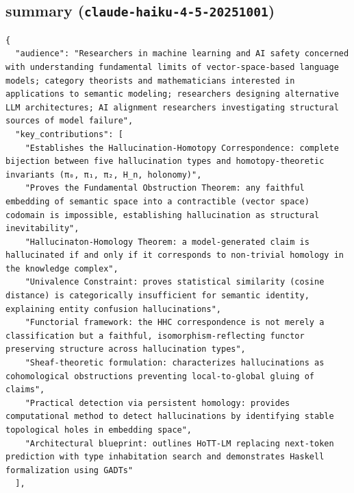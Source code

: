 \documentclass[11pt]{article}
\begin{document}
\subsection*{summary (\texttt{claude-haiku-4-5-20251001})}
\begin{verbatim}
{
  "audience": "Researchers in machine learning and AI safety concerned with understanding fundamental limits of vector-space-based language models; category theorists and mathematicians interested in applications to semantic modeling; researchers designing alternative LLM architectures; AI alignment researchers investigating structural sources of model failure",
  "key_contributions": [
    "Establishes the Hallucination-Homotopy Correspondence: complete bijection between five hallucination types and homotopy-theoretic invariants (π₀, π₁, π₂, H_n, holonomy)",
    "Proves the Fundamental Obstruction Theorem: any faithful embedding of semantic space into a contractible (vector space) codomain is impossible, establishing hallucination as structural inevitability",
    "Hallucinaton-Homology Theorem: a model-generated claim is hallucinated if and only if it corresponds to non-trivial homology in the knowledge complex",
    "Univalence Constraint: proves statistical similarity (cosine distance) is categorically insufficient for semantic identity, explaining entity confusion hallucinations",
    "Functorial framework: the HHC correspondence is not merely a classification but a faithful, isomorphism-reflecting functor preserving structure across hallucination types",
    "Sheaf-theoretic formulation: characterizes hallucinations as cohomological obstructions preventing local-to-global gluing of claims",
    "Practical detection via persistent homology: provides computational method to detect hallucinations by identifying stable topological holes in embedding space",
    "Architectural blueprint: outlines HoTT-LM replacing next-token prediction with type inhabitation search and demonstrates Haskell formalization using GADTs"
  ],

\end{verbatim}
\end{document}
